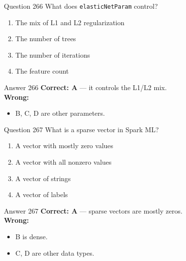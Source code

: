 \documentclass[aspectratio=169,11pt]{beamer}
\begin{document}
	\begin{frame}{Question 266}
		What does \texttt{elasticNetParam} control?
		\begin{enumerate}[label=\Alph*.]
			\item The mix of L1 and L2 regularization
			\item The number of trees
			\item The number of iterations
			\item The feature count
		\end{enumerate}
	\end{frame}
	\begin{frame}{Answer 266}
		\textbf{Correct: A} --- it controls the L1/L2 mix.\\
		\vspace{0.5em}
		\textbf{Wrong:}
		\begin{itemize}
			\item B, C, D are other parameters.
		\end{itemize}
	\end{frame}
	
	\begin{frame}{Question 267}
		What is a sparse vector in Spark ML?
		\begin{enumerate}[label=\Alph*.]
			\item A vector with mostly zero values
			\item A vector with all nonzero values
			\item A vector of strings
			\item A vector of labels
		\end{enumerate}
	\end{frame}
	\begin{frame}{Answer 267}
		\textbf{Correct: A} --- sparse vectors are mostly zeros.\\
		\vspace{0.5em}
		\textbf{Wrong:}
		\begin{itemize}
			\item B is dense.
			\item C, D are other data types.
		\end{itemize}
	\end{frame}
	
\end{document}
